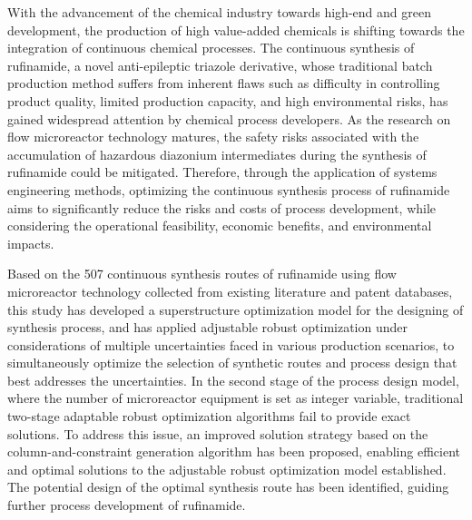 \begin{abstract*}
  With the advancement of the chemical industry towards high-end and green development, the production of high value-added chemicals is shifting towards the integration of continuous chemical processes. The continuous synthesis of rufinamide, a novel anti-epileptic triazole derivative, whose traditional batch production method suffers from inherent flaws such as difficulty in controlling product quality, limited production capacity, and high environmental risks, has gained widespread attention by chemical process developers. As the research on flow microreactor technology matures, the safety risks associated with the accumulation of hazardous diazonium intermediates during the synthesis of rufinamide could be mitigated. Therefore, through the application of systems engineering methods, optimizing the continuous synthesis process of rufinamide aims to significantly reduce the risks and costs of process development, while considering the operational feasibility, economic benefits, and environmental impacts.
  
  Based on the 507 continuous synthesis routes of rufinamide using flow microreactor technology collected from existing literature and patent databases, this study has developed a superstructure optimization model for the designing of synthesis process, and has applied adjustable robust optimization under considerations of multiple uncertainties faced in various production scenarios, to simultaneously optimize the selection of synthetic routes and process design that best addresses the uncertainties. In the second stage of the process design model, where the number of microreactor equipment is set as integer variable, traditional two-stage adaptable robust optimization algorithms fail to provide exact solutions. To address this issue, an improved solution strategy based on the column-and-constraint generation algorithm has been proposed, enabling efficient and optimal solutions to the adjustable robust optimization model established. The potential design of the optimal synthesis route has been identified, guiding further process development of rufinamide.

\end{abstract*}
